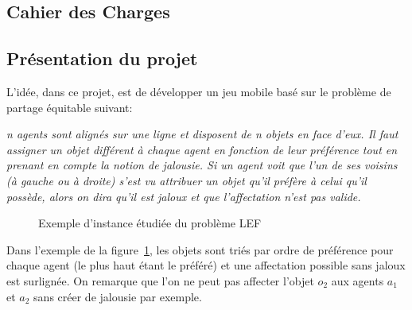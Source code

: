 \documentclass[a4paper, 11pt, titlepage]{article}
\newcommand{\yy}[1]{\colorbox{yellow!70}{#1}}
\newcommand{\vertex}{\node[vertex]}
\begin{document}
\begin{appendix}
\newpage
\section{Cahier des Charges}
    \subsection{Présentation du projet}
    L’idée, dans ce projet, est de développer un jeu mobile basé sur le problème de partage équitable suivant:
    
\textit{n agents sont alignés sur une ligne et disposent de n objets en face d’eux. Il faut assigner un objet différent à chaque agent en fonction de leur préférence tout en prenant en compte la notion de jalousie. Si un agent voit que l’un de ses voisins (à gauche ou à droite) s’est vu attribuer un objet qu’il préfère à celui qu’il possède, alors on dira qu’il est jaloux et que l’affectation n’est pas valide.}
	
	\begin{figure}[ht!]
	    \centering
	    \caption{Exemple d'instance étudiée du problème LEF}
	    \label{fig:ex-instance}
	\end{figure}
	
	Dans l’exemple de la figure~\ref{fig:ex-instance}, les objets sont triés par ordre de préférence pour chaque agent (le plus haut étant le préféré) et une affectation possible sans jaloux est surlignée. On remarque que l'on ne peut pas affecter l'objet $o_2$ aux agents $a_1$ et $a_2$ sans créer de jalousie par exemple.

\end{appendix}
\end{document}
